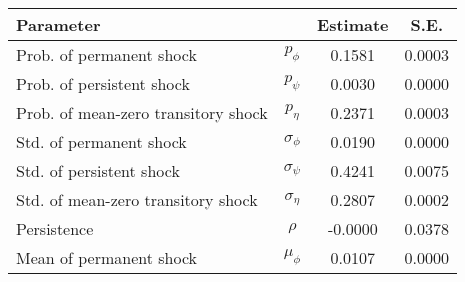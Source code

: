\begin{tabular}{lccc} 
\toprule 
Parameter & & Estimate & S.E. \\ 
\midrule 
Prob. of permanent shock & $p_{\phi}$ &  0.1581 &  0.0003 \\ 
Prob. of persistent shock & $p_{\psi}$ &  0.0030 &  0.0000 \\ 
Prob. of mean-zero transitory shock & $p_{\eta}$ &  0.2371 &  0.0003 \\ 
Std. of permanent shock & $\sigma_{\phi}$ &  0.0190 &  0.0000 \\ 
Std. of persistent shock & $\sigma_{\psi}$ &  0.4241 &  0.0075 \\ 
Std. of mean-zero transitory shock & $\sigma_{\eta}$ &  0.2807 &  0.0002 \\ 
Persistence & $\rho$ & -0.0000 &  0.0378 \\ 
Mean of permanent shock & $\mu_{\phi}$ &  0.0107 &  0.0000 \\ 
\bottomrule
\end{tabular}
